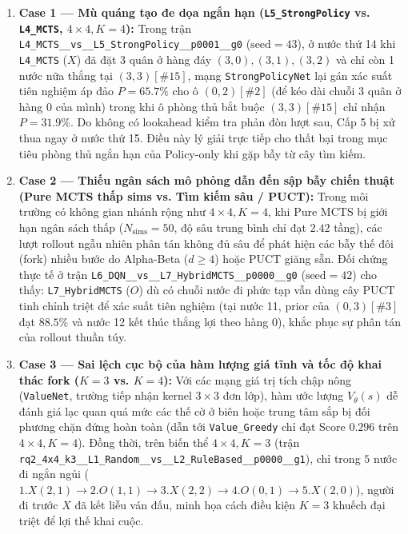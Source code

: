 \documentclass[a4paper,12pt]{report}
\begin{document}
\begin{enumerate}[leftmargin=1.2cm]
    \item \textbf{Case 1 --- Mù quáng tạo đe dọa ngắn hạn (\texttt{L5\_\allowbreak StrongPolicy} vs. \texttt{L4\_\allowbreak MCTS}, $4 \times 4, K=4$):}
    Trong trận \texttt{L4\_\allowbreak MCTS\_\_\allowbreak vs\_\_\allowbreak L5\_\allowbreak StrongPolicy\_\_\allowbreak p0001\_\_\allowbreak g0} ($\text{seed}=43$), ở nước thứ 14 khi \texttt{L4\_\allowbreak MCTS} ($X$) đã đặt 3 quân ở hàng đáy $(3,0), (3,1), (3,2)$ và chỉ còn 1 nước nữa thắng tại $(3,3)[\#15]$, mạng \texttt{StrongPolicyNet} lại gán xác suất tiên nghiệm áp đảo $P = 65.7\%$ cho ô $(0,2)[\#2]$ (để kéo dài chuỗi 3 quân ở hàng $0$ của mình) trong khi ô phòng thủ bắt buộc $(3,3)[\#15]$ chỉ nhận $P = 31.9\%$. Do không có lookahead kiểm tra phản đòn lượt sau, Cấp 5 bị xử thua ngay ở nước thứ 15. Điều này lý giải trực tiếp cho thất bại trong mục tiêu phòng thủ ngắn hạn của Policy-only khi gặp bẫy từ cây tìm kiếm.

    \item \textbf{Case 2 --- Thiếu ngân sách mô phỏng dẫn đến sập bẫy chiến thuật (Pure MCTS thấp sims vs. Tìm kiếm sâu / PUCT):}
    Trong môi trường có không gian nhánh rộng như $4\times 4, K=4$, khi Pure MCTS bị giới hạn ngân sách thấp ($N_{\text{sims}} = 50$, độ sâu trung bình chỉ đạt $2.42$ tầng), các lượt rollout ngẫu nhiên phân tán không đủ sâu để phát hiện các bẫy thế đôi (fork) nhiều bước do Alpha-Beta ($d \ge 4$) hoặc PUCT giăng sẵn. Đối chứng thực tế ở trận \texttt{L6\_\allowbreak DQN\_\_\allowbreak vs\_\_\allowbreak L7\_\allowbreak HybridMCTS\_\_\allowbreak p0000\_\_\allowbreak g0} ($\text{seed}=42$) cho thấy: \texttt{L7\_\allowbreak HybridMCTS} ($O$) dù có chuỗi nước đi phức tạp vẫn dùng cây PUCT tinh chỉnh triệt để xác suất tiên nghiệm (tại nước 11, prior của $(0,3)[\#3]$ đạt $88.5\%$ và nước 12 kết thúc thắng lợi theo hàng $0$), khắc phục sự phân tán của rollout thuần túy.

    \item \textbf{Case 3 --- Sai lệch cục bộ của hàm lượng giá tĩnh và tốc độ khai thác fork ($K=3$ vs. $K=4$):}
    Với các mạng giá trị tích chập nông (\texttt{ValueNet}, trường tiếp nhận kernel $3 \times 3$ đơn lớp), hàm ước lượng $V_\theta(s)$ dễ đánh giá lạc quan quá mức các thế cờ ở biên hoặc trung tâm sắp bị đối phương chặn đứng hoàn toàn (dẫn tới \texttt{Value\_\allowbreak Greedy} chỉ đạt Score $0.296$ trên $4\times 4, K=4$). Đồng thời, trên biến thể $4\times 4, K=3$ (trận \texttt{rq2\_\allowbreak 4x4\_\allowbreak k3\_\_\allowbreak L1\_\allowbreak Random\_\_\allowbreak vs\_\_\allowbreak L2\_\allowbreak RuleBased\_\_\allowbreak p0000\_\_\allowbreak g1}), chỉ trong $5$ nước đi ngắn ngủi ($1.X(2,1) \rightarrow 2.O(1,1) \rightarrow 3.X(2,2) \rightarrow 4.O(0,1) \rightarrow 5.X(2,0)$), người đi trước $X$ đã kết liễu ván đấu, minh họa cách điều kiện $K=3$ khuếch đại triệt để lợi thế khai cuộc.


\end{enumerate}
\end{document}
